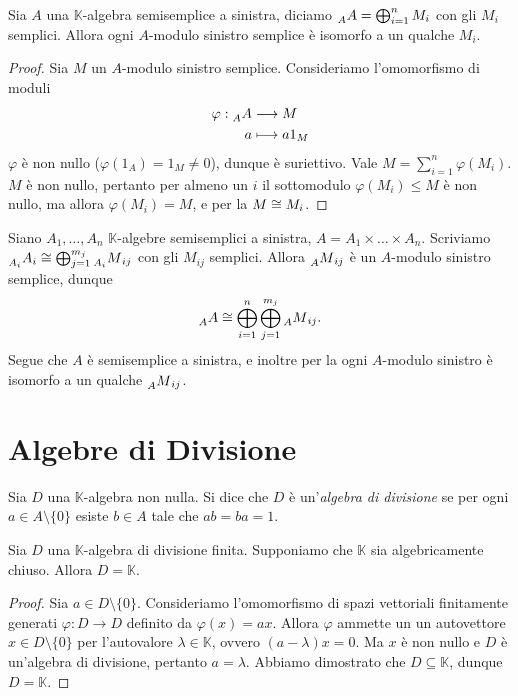 \begin{proposition}
Sia $A$ una $\mathbb{K}$-algebra semisemplice a sinistra, diciamo $\prescript{}{A}{A}=\bigoplus_{i=1}^{n}M_i$ con gli $M_i$ semplici. Allora ogni $A$-modulo sinistro semplice è isomorfo a un qualche $M_i$.
\end{proposition}
\begin{proof}
Sia $M$ un $A$-modulo sinistro semplice. Consideriamo l'omomorfismo di moduli
\begin{align*}
\varphi:\prescript{}{A}{A}&\longrightarrow M\\
a&\longmapsto a1_M
\end{align*}
$\varphi$ è non nullo ($\varphi(1_A)=1_M\neq 0$), dunque è suriettivo. Vale $M=\sum_{i=1}^{n}\varphi(M_i)$. $M$ è non nullo, pertanto per almeno un $i$ il sottomodulo $\varphi(M_i)\le M$ è non nullo, ma allora $\varphi(M_i)=M$, e per la  $M\cong M_i$.
\end{proof}

\begin{remark}
Siano $A_1,\ldots,A_n$ $\mathbb{K}$-algebre semisemplici a sinistra, $A=A_1\times\ldots\times A_n$. Scriviamo $\prescript{}{A_i}{A}_i\cong\bigoplus_{j=1}^{m_j}\prescript{}{A_i}{M}_{ij}$ con gli $M_{ij}$ semplici. Allora $\prescript{}{A}{M}_{ij}$ è un $A$-modulo sinistro semplice, dunque
$$
\prescript{}{A}{A}\cong\bigoplus_{i=1}^{n}\bigoplus_{j=1}^{m_j}\prescript{}{A}{M}_{ij}.
$$
Segue che $A$ è semisemplice a sinistra, e inoltre per la  ogni $A$-modulo sinistro è isomorfo a un qualche $\prescript{}{A}{M}_{ij}$.
\end{remark}



\section{Algebre di Divisione}

\begin{definition}
Sia $D$ una $\mathbb{K}$-algebra non nulla. Si dice che $D$ è un'\emph{algebra di divisione} se per ogni $a\in A\setminus\{0\}$ esiste $b\in A$ tale che $ab=ba=1$.
\end{definition}


\begin{proposition}
Sia $D$ una $\mathbb{K}$-algebra di divisione finita. Supponiamo che $\mathbb{K}$ sia algebricamente chiuso. Allora $D=\mathbb{K}$.
\end{proposition}
\begin{proof}
Sia $a\in D\setminus\{0\}$. Consideriamo l'omomorfismo di spazi vettoriali finitamente generati $\varphi:D\to D$ definito da $\varphi(x)=ax$.  Allora $\varphi$ ammette un un autovettore $x\in D\setminus\{0\}$ per l'autovalore $\lambda\in\mathbb{K}$, ovvero $(a-\lambda)x=0$. Ma $x$ è non nullo e $D$ è un'algebra di divisione, pertanto $a=\lambda$. Abbiamo dimostrato che $D\subseteq\mathbb{K}$, dunque $D=\mathbb{K}$.
\end{proof}


